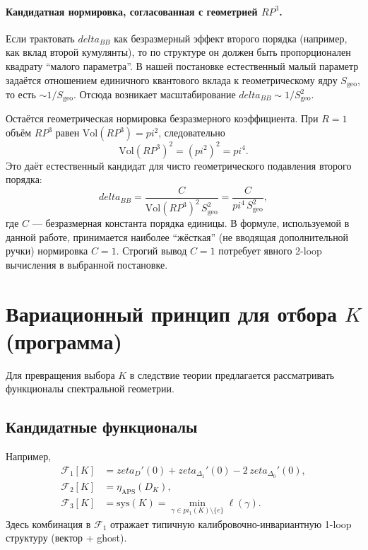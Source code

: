 \documentclass[12pt]{article}
\def\mathbb#1{#1}%
\def\pi{pi}%
\def\delta{delta}%
\def\zeta{zeta}%
\begin{document}
\paragraph{Кандидатная нормировка, согласованная с геометрией $\mathbb{RP}^3$.}
Если трактовать $\delta_{BB}$ как безразмерный эффект второго порядка (например, как вклад второй кумулянты), то по структуре он должен быть пропорционален квадрату ``малого параметра''.
В нашей постановке естественный малый параметр задаётся отношением единичного квантового вклада к геометрическому ядру $S_{\mathrm{geo}}$, то есть $\sim 1/S_{\mathrm{geo}}$.
Отсюда возникает масштабирование $\delta_{BB}\sim 1/S_{\mathrm{geo}}^2$.

Остаётся геометрическая нормировка безразмерного коэффициента.
При $R=1$ объём $\mathbb{RP}^3$ равен
$\mathrm{Vol}(\mathbb{RP}^3)=\pi^2$, следовательно
\begin{equation}
\mathrm{Vol}(\mathbb{RP}^3)^2=(\pi^2)^2=\pi^4.
\end{equation}
Это даёт естественный кандидат для чисто геометрического подавления второго порядка:
\begin{equation}
\delta_{BB}=\frac{C}{\mathrm{Vol}(\mathbb{RP}^3)^2\,S_{\mathrm{geo}}^2}
=\frac{C}{\pi^4\,S_{\mathrm{geo}}^2},
\end{equation}
где $C$ --- безразмерная константа порядка единицы.
В формуле, используемой в данной работе, принимается наиболее ``жёсткая'' (не вводящая дополнительной ручки) нормировка $C=1$.
Строгий вывод $C=1$ потребует явного 2-loop вычисления в выбранной постановке.


\section{Вариационный принцип для отбора $K$ (программа)}
Для превращения выбора $K$ в следствие теории предлагается рассматривать функционалы спектральной геометрии.

\subsection{Кандидатные функционалы}
Например,
\begin{align}
\mathcal{F}_1[K] &= \zeta_{D}'(0) + \zeta_{\Delta_1}'(0) - 2\,\zeta_{\Delta_0}'(0), \\
\mathcal{F}_2[K] &= \eta_{\mathrm{APS}}(D_K), \\
\mathcal{F}_3[K] &= \mathrm{sys}(K) = \min_{\gamma\in\pi_1(K)\setminus\{e\}} \ell(\gamma).
\end{align}
Здесь комбинация в $\mathcal{F}_1$ отражает типичную калибровочно-инвариантную 1-loop структуру (вектор + ghost).
\end{document}
